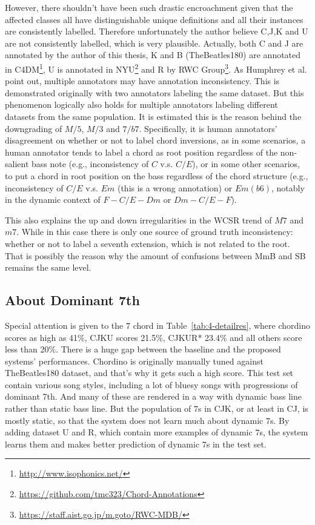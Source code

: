 However, there shouldn't have been such drastic encroachment given that the affected classes all have distinguishable unique definitions and all their instances are consistently labelled. Therefore unfortunately the author believe C,J,K and U are not consistently labelled, which is very plausible. Actually, both C and J are annotated by the author of this thesis, K and B (TheBeatles180) are annotated in C4DM\footnote{\url{http://www.isophonics.net/}}, U is annotated in NYU\footnote{\url{https://github.com/tmc323/Chord-Annotations}} and R by RWC Group\footnote{\url{https://staff.aist.go.jp/m.goto/RWC-MDB/}}. As Humphrey et al. \cite{humphreyfour} point out, multiple annotators may have annotation inconsistency. This is demonstrated originally with two annotators labeling the same dataset. But this phenomenon logically also holds for multiple annotators labeling different datasets from the same population. It is estimated this is the reason behind the downgrading of $M/5$, $M/3$ and $7/b7$. Specifically, it is human annotators' disagreement on whether or not to label chord inversions, as in some scenarios, a human annotator tends to label a chord as root position regardless of the non-salient bass note (e.g., inconsistency of $C$ v.s. $C/E$), or in some other scenarios, to put a chord in root position on the bass regardless of the chord structure (e.g., inconsistency of $C/E$ v.s. $Em$ (this is a wrong annotation) or $Em(b6)$, notably in the dynamic context of $F-C/E-Dm$ or $Dm-C/E-F$).

This also explains the up and down irregularities in the WCSR trend of $M7$ and $m7$. While in this case there is only one source of ground truth inconsistency: whether or not to label a seventh extension, which is not related to the root. That is possibly the reason why the amount of confusions between MmB and SB remains the same level.

\subsection{About Dominant 7th}
Special attention is given to the $7$ chord in Table~\ref{tab:4-detailres}, where chordino scores as high as 41\%, CJKU scores 21.5\%, CJKUR* 23.4\% and all others score less than 20\%. There is a huge gap between the baseline and the proposed systems' performances. Chordino is originally manually tuned against TheBeatles180 dataset, and that's why it gets such a high score. This test set contain various song styles, including a lot of bluesy songs with progressions of dominant 7th. And many of these are rendered in a way with dynamic bass line rather than static bass line. But the population of $7$s in CJK, or at least in CJ, is mostly static, so that the system does not learn much about dynamic $7$s. By adding dataset U and R, which contain more examples of dynamic $7$s, the system learns them and makes better prediction of dynamic $7$s in the test set.

